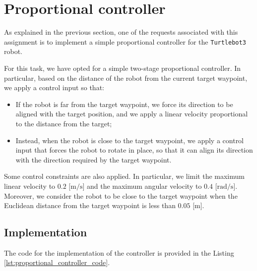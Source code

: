 \section{Proportional controller}
\label{sec:proportional_controller}

As explained in the previous section, one of the requests associated with this assignment is to implement a simple proportional controller for the \texttt{Turtlebot3} robot.

For this task, we have opted for a simple two-stage proportional controller.
In particular, based on the distance of the robot from the current target waypoint, we apply a control input so that:

\begin{itemize}
    \item If the robot is far from the target waypoint, we force its direction to be aligned with the target position, and we apply a linear velocity proportional to the distance from the target;
    \item Instead, when the robot is close to the target waypoint, we apply a control input that forces the robot to rotate in place, so that it can align its direction with the direction required by the target waypoint.
\end{itemize}

Some control constraints are also applied.
In particular, we limit the maximum linear velocity to $0.2 \text{ [m/s]}$ and the maximum angular velocity to $0.4 \text{ [rad/s]}$.
Moreover, we consider the robot to be close to the target waypoint when the Euclidean distance from the target waypoint is less than $0.05 \text{ [m]}$.



\subsection{Implementation}
\label{subsec:implementation_proportional_controller}

The code for the implementation of the controller is provided in the Listing \ref{lst:proportional_controller_code}.

